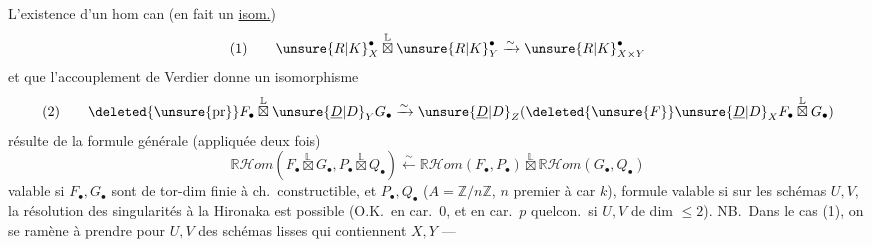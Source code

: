 
L'existence d'un hom can (en fait un \uline{isom.})
\[
\text{(1)}\qquad \unsure{R|K}_X^\bullet\overset{\mathbb{L}}{\boxtimes}\unsure{R|K}_Y^\bullet\xrightarrow{\sim}\unsure{R|K}_{X\times Y}^\bullet
\]
et  que l'accouplement de Verdier donne un isomorphisme
\[
\text{(2)}\qquad\deleted{\unsure{\operatorname{pr}}}F_\bullet\overset{\mathbb{L}}{\boxtimes}\unsure{\underline{D}|D}_Y G_\bullet\xrightarrow{\sim}\unsure{\underline{D}|D}_Z(\deleted{\unsure{F}}\unsure{\underline{D}|D}_X F_\bullet\overset{\mathbb{L}}{\boxtimes}G_\bullet)
\]
résulte de la formule générale (appliquée deux fois)
\[
\boxed{\mathbb{R}\mathcal{H}om(F_\bullet\overset{\mathbb{L}}{\boxtimes}G_\bullet,P_\bullet\overset{\mathbb{L}}{\boxtimes}Q_\bullet)\xleftarrow{\sim}\mathbb{R}\mathcal{H}om(F_\bullet,P_\bullet)\overset{\mathbb{L}}{\boxtimes}\mathbb{R}\mathcal{H}om(G_\bullet,Q_\bullet)}
\]
valable si $F_\bullet,G_\bullet$ sont de tor-dim finie à ch.\ constructible, et $P_\bullet,Q_\bullet$  
($A=\mathbb{Z}/n\mathbb{Z}$, $n$ premier à car $k$),
formule valable si sur les schémas  $U,V$,  la résolution des singularités à la Hironaka est possible (O.K.\ en car.\ 0, et en car.\ $p$ quelcon.\ si $U,V$ de dim $\leq2$).
NB.\ Dans le cas (1), on se ramène à prendre pour $U,V$ des schémas lisses qui contiennent $X,Y$ --- 

